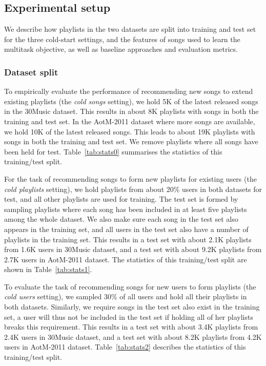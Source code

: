 \subsection{Experimental setup}

We describe how playlists in the two datasets are split into training and test set for the three cold-start settings,
and the features of songs used to learn the multitask objective, as well as baseline approaches and evaluation metrics.

\subsubsection{Dataset split}
To empirically evaluate the performance of recommending new songs to extend existing playlists (\ie the \emph{cold songs} setting),
we hold 5K of the latest released songs in the 30Music dataset. 
This results in about 8K playlists with songs in both the training and test set.
In the AotM-2011 dataset where more songs are available, we hold 10K of the latest released songs.
This leads to about 19K playlists with songs in both the training and test set.
We remove playlists where all songs have been held for test. %
Table~\ref{tab:stats0} summarises the statistics of this training/test split.

For the task of recommending songs to form new playlists for existing users (\ie the \emph{cold playlists} setting),
we hold playlists from about 20\% users in both datasets for test, and all other playlists are used for training.
The test set is formed by sampling playlists where each song has been included in at least five playlists among the whole dataset.
We also make sure each song in the test set also appears in the training set,
and all users in the test set also have a number of playlists in the training set.
This results in a test set with about 2.1K playlists from 1.6K users in 30Music dataset,
and a test set with about 9.2K playlists from 2.7K users in AotM-2011 dataset.
The statistics of this training/test split are shown in Table~\ref{tab:stats1}.

To evaluate the task of recommending songs for new users to form playlists (\ie the \emph{cold users} setting),
we sampled 30\% of all users and hold all their playlists in both datasets.
Similarly, we require songs in the test set also exist in the training set,
a user will thus not be included in the test set if holding all of her playlists breaks this requirement.
This results in a test set with about 3.4K playlists from 2.4K users in 30Music dataset,
and a test set with about 8.2K playlists from 4.2K users in AotM-2011 dataset.
Table~\ref{tab:stats2} describes the statistics of this training/test split.


